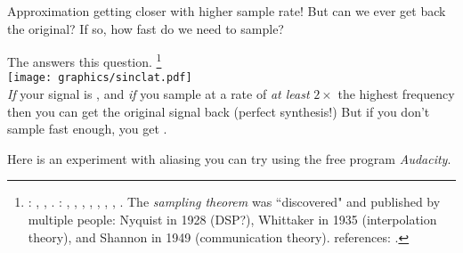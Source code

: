 Approximation getting closer with higher sample rate!
But can we ever get back the original?
If so, how fast do we need to sample?


The  answers this question.
\footnote{
  :
  ,
  ,
  .
  :
  ,
  ,
  ,
  ,
  ,
  ,
  ,
  .
  The {\em sampling theorem} was ``discovered" and published by multiple people: 
  Nyquist in 1928 (DSP?), 
  Whittaker in 1935 (interpolation theory),
  and Shannon in 1949 (communication theory).
  references:  
  .
  }
\\
\texttt{[image: graphics/sinclat.pdf]}
\\
\emph{If} your signal is , and
\emph{if} you sample at a rate of \emph{at least} $2\times$ the highest frequency %
then you can get the original signal back (perfect synthesis!)
But if you don't sample fast enough, you get .

\begin{example}
Here is an experiment with aliasing you can try using the free program \emph{Audacity}.
\\
\end{example}



